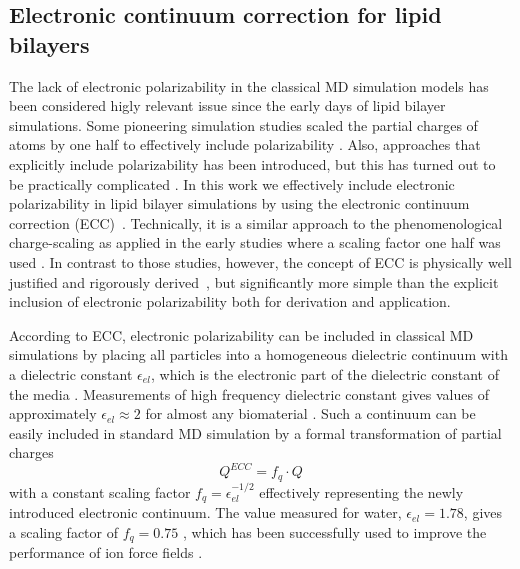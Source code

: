 \documentclass[aip,jcp,twocolumn]{revtex4}
\begin{document}
\subsection{Electronic continuum correction for lipid bilayers}
The lack of electronic polarizability in the classical MD simulation
models has been considered higly relevant issue since the early days of
lipid bilayer simulations. Some pioneering simulation studies scaled
the partial charges of atoms by one half to effectively include 
polarizability \cite{jonsson86,egberts94}. Also, approaches that
explicitly include polarizability has been introduced, but
this has turned out to be practically complicated \cite{chowdhary13}.
In this work we effectively include electronic polarizability in lipid
bilayer simulations by using the electronic continuum correction
(ECC)~\cite{leontyev11}. 
Technically, it is a similar approach to the phenomenological charge-scaling as applied in 
the early studies where a scaling factor one half was used \cite{jonsson86,egberts94}. 
In contrast to those studies, however, the concept of ECC is 
physically well justified and rigorously derived~\cite{leontyev09, leontyev10, leontyev11},
but significantly more simple than the explicit inclusion of electronic
polarizability \cite{chowdhary13} both for derivation and application.


According to ECC, electronic
polarizability can be included in classical MD simulations by
placing all particles into a homogeneous dielectric continuum 
with a dielectric constant $\epsilon _{el}$, 
which is the electronic part of the dielectric constant of 
the media \cite{leontyev11}. Measurements of high frequency 
dielectric constant gives values of approximately $\epsilon _{el} \approx 2$ 
for almost any biomaterial \cite{some_original_work, leontyev11}.
Such a continuum can be easily included in standard MD simulation by
a formal transformation of partial charges 
\begin{equation}
  Q^{ECC} = f_q \cdot Q
\end{equation}
with a constant scaling factor $f_q = \epsilon _{el} ^{-1/2}$ 
effectively representing the newly introduced electronic continuum. 
The value measured for water, $\epsilon _{el} = 1.78$, gives 
a scaling factor of $f_q = 0.75$ \cite{some_orig_source, leontyev11}, which has been
successfully used to improve the performance of ion force fields \cite{kohagen14,kohagen16,??}. 
\end{document}
